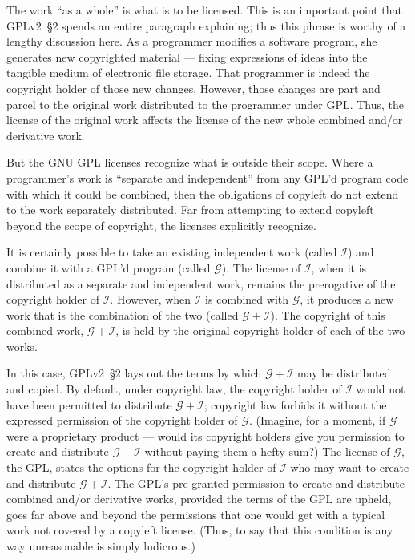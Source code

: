 The work ``as a whole'' is what is to be licensed. This is an important
point that GPLv2~\S2 spends an entire paragraph explaining; thus this phrase is
worthy of a lengthy discussion here.  As a programmer modifies a software
program, she generates new copyrighted material --- fixing expressions of
ideas into the tangible medium of electronic file storage.  That
programmer is indeed the copyright holder of those new changes.  However,
those changes are part and parcel to the original work distributed to
the programmer under GPL\@. Thus, the license of the original work
affects the license of the new whole combined and/or derivative work.

\newcommand{\gplusi}{$\mathcal{G\!\!+\!\!I}$}
\newcommand{\worki}{$\mathcal{I}$}
\newcommand{\workg}{$\mathcal{G}$}

\label{separate-and-independent}


But the GNU GPL licenses recognize what is outside their scope. Where a programmer’s work is
``separate and independent'' from any GPL’d program code with which it could be
combined, then the obligations of copyleft do not extend to the work
separately distributed. Far from attempting to extend copyleft beyond the
scope of copyright, the licenses explicitly recognize.

It is certainly possible to take an existing independent work (called
\worki{}) and combine it with a GPL'd program (called \workg{}).  The
license of \worki{}, when it is distributed as a separate and independent
work, remains the prerogative of the copyright holder of \worki{}.
However, when \worki{} is combined with \workg{}, it produces a new work
that is the combination of the two (called \gplusi{}). The copyright of
this combined work, \gplusi{}, is held by the original copyright
holder of each of the two works.

In this case, GPLv2~\S2 lays out the terms by which \gplusi{} may be
distributed and copied.  By default, under copyright law, the copyright
holder of \worki{} would not have been permitted to distribute \gplusi{};
copyright law forbids it without the expressed permission of the copyright
holder of \workg{}. (Imagine, for a moment, if \workg{} were a proprietary
product --- would its copyright holders  give you permission to create and distribute
\gplusi{} without paying them a hefty sum?)  The license of \workg{}, the
GPL, states the  options for the copyright holder of \worki{}
who may want to create and distribute \gplusi{}. The  GPL's pre-granted
permission to create and distribute combined and/or derivative works, provided the terms
of the GPL are upheld, goes far above and beyond the permissions that one
would get with a typical work not covered by a copyleft license.  (Thus, to
say that this condition is any way unreasonable is simply ludicrous.)

